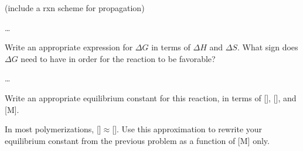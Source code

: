 \begin{activity}
\begin{instructornotes}
\end{instructornotes}


\begin{model}
	\label{\labelbase:mdl:propthermo}

	(include a rxn scheme for propagation)
	
\end{model}


\begin{ctqs}

	\question \dots
	
	\question Write an appropriate expression for $\Delta G$ in terms of $\Delta H$ and $\Delta S$.  What sign does $\Delta G$ need to have in order for the reaction to be favorable? \label{\labelbase:ctq:DeltaG}

\end{ctqs}




\begin{model}
	\label{\labelbase:mdl:propequilib}

	\dots
	
\end{model}


\begin{ctqs}

	\question Write an appropriate equilibrium constant for this reaction, in terms of [], [], and [M].
	
	\question In most polymerizations, []$\approx$[].  Use this approximation to rewrite your equilibrium constant from the previous problem as a function of [M] only.
	
	
	

\end{ctqs}
\end{activity}
